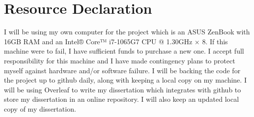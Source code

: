 \documentclass[11pt,a4paper]{article}
\begin{document}
\section{Resource Declaration}
I will be using my own computer for the project which is an ASUS ZenBook with 16GB RAM and an Intel® Core™ i7-1065G7 CPU @ 1.30GHz × 8. If this machine were to fail, I have sufficient funds to purchase a new one. 
I accept full responsibility for this machine and I have made contingency plans to protect myself against hardware and/or software failure.
I will be backing the code for the project up to github daily, along with keeping a local copy on my machine. I will be using Overleaf to write my dissertation which integrates with github to store my dissertation in an online repository. I will also keep an updated local copy of my dissertation.

\printbibliography
\end{document}
